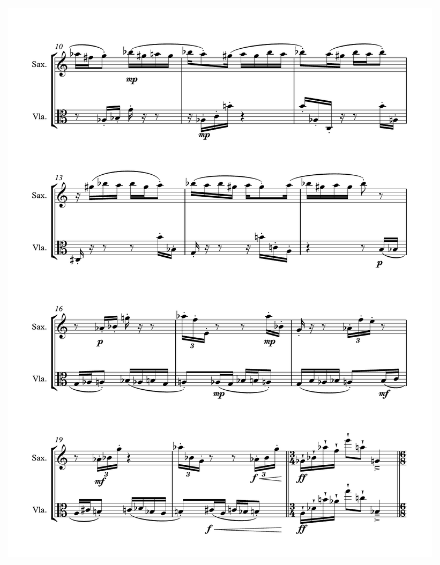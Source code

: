 \begin{figure}[htbp]
    \centering
	\includegraphics[width=6.5in]{figures/Sax_Viola_2.pdf}
\end{figure}

